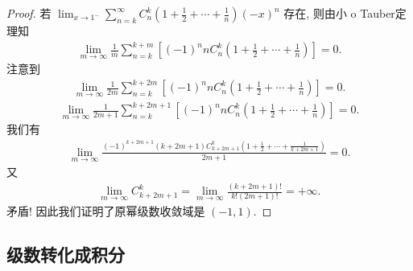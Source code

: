 \documentclass[../../main.tex]{subfiles}%
\begin{document}
\begin{proof}
若 $\lim_{x \to 1^-} \sum_{n=k}^{\infty} C_n^k \left(1 + \frac{1}{2} + \cdots + \frac{1}{n}\right) (-x)^n$ 存在, 则由小 o Tauber定理知
\begin{align*}
\lim_{m \to \infty} \frac{1}{m} \sum_{n=k}^{k + m} \left[(-1)^n n C_n^k \left(1 + \frac{1}{2} + \cdots + \frac{1}{n}\right)\right] = 0 .
\end{align*}
注意到
\begin{align*}
\lim_{m \to \infty} \frac{1}{2m} \sum_{n=k}^{k + 2m} \left[(-1)^n n C_n^k \left(1 + \frac{1}{2} + \cdots + \frac{1}{n}\right)\right] = 0.
\end{align*}
\begin{align*}
\lim_{m \to \infty} \frac{1}{2m + 1} \sum_{n=k}^{k + 2m + 1} \left[(-1)^n n C_n^k \left(1 + \frac{1}{2} + \cdots + \frac{1}{n}\right)\right] = 0 .
\end{align*}
我们有
\begin{align*}
\lim_{m \to \infty} \frac{(-1)^{k + 2m + 1} (k + 2m + 1) C_{k + 2m + 1}^k \left(1 + \frac{1}{2} + \cdots + \frac{1}{k + 2m + 1}\right)}{2m + 1} = 0.
\end{align*}
又
\begin{align*}
\lim_{m \to \infty} C_{k + 2m + 1}^k = \lim_{m \to \infty} \frac{(k + 2m + 1)!}{k! (2m + 1)!} = +\infty .
\end{align*}
矛盾! 因此我们证明了原幂级数收敛域是 $(-1, 1)$.

\end{proof}



\subsection{级数转化成积分}
\end{document}
